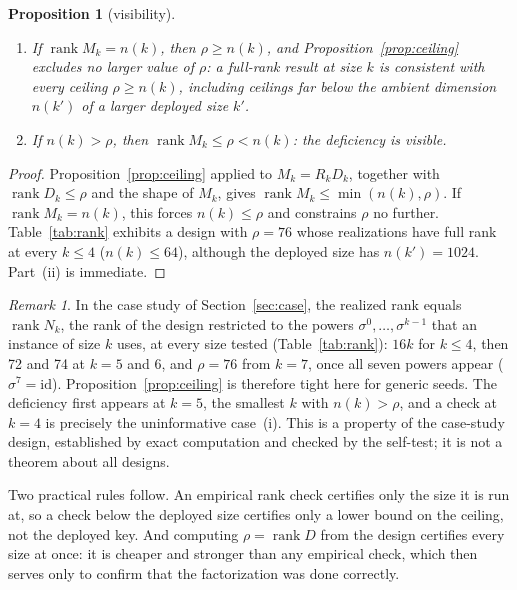 \documentclass[11pt]{article}
\makeatletter
\newtheorem{proposition}{Proposition}
\theoremstyle{remark}
\newtheorem{remark}{Remark}
\DeclareMathOperator{\rank}{rank}
\DeclareRobustCommand{\_}{%
  \edef\@tempa{\ttdefault}%
  \ifx\f@family\@tempa\char95 \else\textunderscore\fi\penalty300\relax}
\makeatother
\begin{document}
\begin{proposition}[visibility]\label{prop:vis}
\leavevmode
\begin{enumerate}
\item[(i)] If $\rank M_k=n(k)$, then $\rho\ge n(k)$, and Proposition~\ref{prop:ceiling} excludes no larger value of
  $\rho$: a full-rank result at size $k$ is consistent with every ceiling $\rho\ge n(k)$, including ceilings far below
  the ambient dimension $n(k')$ of a larger deployed size $k'$.
\item[(ii)] If $n(k)>\rho$, then $\rank M_k\le\rho<n(k)$: the deficiency is visible.
\end{enumerate}
\end{proposition}

\begin{proof}
Proposition~\ref{prop:ceiling} applied to $M_k=R_kD_k$, together with $\rank D_k\le\rho$ and the shape of $M_k$, gives
$\rank M_k\le\min(n(k),\rho)$. If $\rank M_k=n(k)$, this forces $n(k)\le\rho$ and constrains $\rho$ no further.
Table~\ref{tab:rank} exhibits a design with $\rho=76$ whose realizations have full rank at every $k\le4$ ($n(k)\le64$),
although the deployed size has $n(k')=1024$. Part~(ii) is immediate.
\end{proof}

\begin{remark}\label{rem:tight}
In the case study of Section~\ref{sec:case}, the realized rank equals $\rank N_k$, the rank of the design restricted to
the powers $\sigma^0,\dots,\sigma^{k-1}$ that an instance of size $k$ uses, at every size tested (Table~\ref{tab:rank}):
$16k$ for $k\le4$, then 72 and 74 at $k=5$ and $6$, and $\rho=76$ from $k=7$, once all seven powers appear
($\sigma^7=\mathrm{id}$). Proposition~\ref{prop:ceiling} is therefore tight here for generic seeds. The deficiency first
appears at $k=5$, the smallest $k$ with $n(k)>\rho$, and a check at $k=4$ is precisely the uninformative case~(i). This
is a property of the case-study design, established by exact computation and checked by the self-test; it is not a
theorem about all designs.
\end{remark}

Two practical rules follow. An empirical rank check certifies only the size it is run at, so a check below the deployed
size certifies only a lower bound on the ceiling, not the deployed key. And computing $\rho=\rank D$ from the design certifies every size at once:
it is cheaper and stronger than any empirical check, which then serves only to confirm that the factorization was done
correctly.
\end{document}
